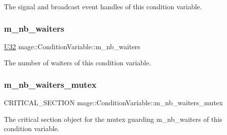 The signal and broadcast event handles of this condition variable. \hypertarget{structmage_1_1_condition_variable_a1166a25b69eb4b510b551c6c74a13046}{}\label{structmage_1_1_condition_variable_a1166a25b69eb4b510b551c6c74a13046} 
\subsubsection{\texorpdfstring{m\+\_\+nb\+\_\+waiters}{m\_nb\_waiters}}
{\footnotesize\ttfamily \hyperlink{namespacemage_a41c104c036fba3756a74e19f793eeaa1}{U32} mage\+::\+Condition\+Variable\+::m\+\_\+nb\+\_\+waiters\hspace{0.3cm}{\ttfamily [private]}}

The number of waiters of this condition variable. \hypertarget{structmage_1_1_condition_variable_a0686e682d62d44ff1eb9ac45acbb0eab}{}\label{structmage_1_1_condition_variable_a0686e682d62d44ff1eb9ac45acbb0eab} 
\subsubsection{\texorpdfstring{m\+\_\+nb\+\_\+waiters\+\_\+mutex}{m\_nb\_waiters\_mutex}}
{\footnotesize\ttfamily C\+R\+I\+T\+I\+C\+A\+L\+\_\+\+S\+E\+C\+T\+I\+ON mage\+::\+Condition\+Variable\+::m\+\_\+nb\+\_\+waiters\+\_\+mutex\hspace{0.3cm}{\ttfamily [private]}}

The critical section object for the mutex guarding {\ttfamily m\+\_\+nb\+\_\+waiters} of this condition variable. 